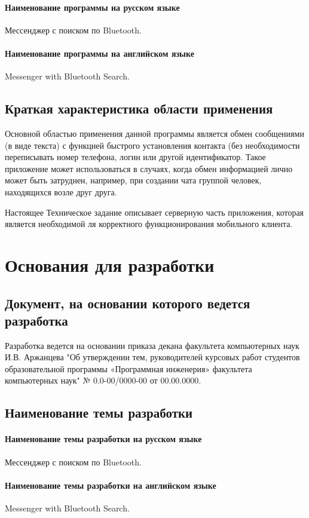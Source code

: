 \documentclass[techtask]{espd}
\begin{document}
\paragraph{Наименование программы на русском языке}
Мессенджер с поиском по Bluetooth.
\paragraph{Наименование программы на английском языке}
Messenger with Bluetooth Search.

\subsection{Краткая характеристика области применения}
Основной областью применения данной программы является обмен сообщениями (в виде текста) с функцией быстрого установления контакта (без необходимости переписывать номер телефона, логин или другой идентификатор. Такое приложение может использоваться в случаях, когда обмен информацией лично может быть затруднен, например, при создании чата группой человек, находящихся возле друг друга.

Настоящее Техническое задание описывает серверную часть приложения, которая является необходимой ля корректного функционирования мобильного клиента.

\section{Основания для разработки}
\subsection{Документ, на основании которого ведется разработка}
Разработка ведется на основании приказа декана факультета компьютерных наук И.В. Аржанцева "Об утверждении тем, руководителей курсовых работ студентов образовательной программы «Программная инженерия» факультета компьютерных наук" № 0.0-00/0000-00 от 00.00.0000.

\subsection{Наименование темы разработки}
\paragraph{Наименование темы разработки на русском языке}
Мессенджер с поиском по Bluetooth.

\paragraph{Наименование темы разработки на английском языке}
Messenger with Bluetooth Search.
\end{document}
